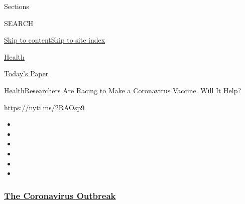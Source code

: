 Sections

SEARCH

\protect\hyperlink{site-content}{Skip to
content}\protect\hyperlink{site-index}{Skip to site index}

\href{https://www.nytimes3xbfgragh.onion/section/health}{Health}

\href{https://myaccount.nytimes3xbfgragh.onion/auth/login?response_type=cookie\&client_id=vi}{}

\href{https://www.nytimes3xbfgragh.onion/section/todayspaper}{Today's
Paper}

\href{/section/health}{Health}\textbar{}Researchers Are Racing to Make a
Coronavirus Vaccine. Will It Help?

\url{https://nyti.ms/2RAOsp9}

\begin{itemize}
\item
\item
\item
\item
\item
\item
\end{itemize}

\hypertarget{the-coronavirus-outbreak}{%
\subsubsection{\texorpdfstring{\href{https://www.nytimes3xbfgragh.onion/news-event/coronavirus?name=styln-coronavirus-national\&region=TOP_BANNER\&block=storyline_menu_recirc\&action=click\&pgtype=Article\&impression_id=92efbf00-f4cd-11ea-a9ee-334f178d1f9e\&variant=undefined}{The
Coronavirus
Outbreak}}{The Coronavirus Outbreak}}\label{the-coronavirus-outbreak}}

